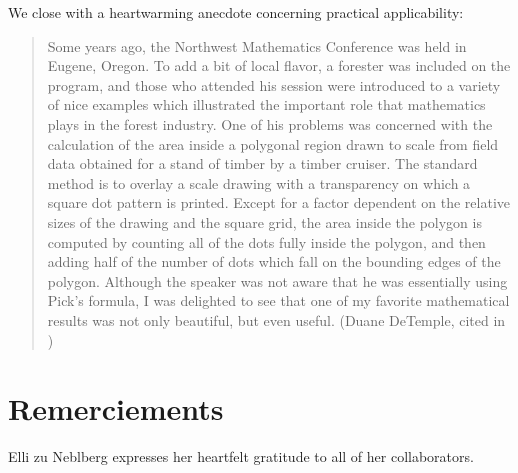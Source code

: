 \documentclass[a4paper]{amsart}
\numberwithin{equation}{section}
\theoremstyle{plain}
\theoremstyle{definition}
\begin{document}
We close with a heartwarming anecdote concerning practical applicability: 

\begin{quote}
  Some years ago, the Northwest Mathematics Conference was held in Eugene,
  Oregon. To add a bit of local flavor, a forester was included on the program,
  and those who attended his session were introduced to a variety of nice
  examples which illustrated the important role that mathematics plays in the
  forest industry. One of his problems was concerned with the calculation of
  the area inside a polygonal region drawn to scale from field data obtained for
  a stand of timber by a timber cruiser. The standard method is to overlay a
  scale drawing with a transparency on which a square dot pattern is printed.
  Except for a factor dependent on the relative sizes of the drawing and the
  square grid, the area inside the polygon is computed by counting all of the
  dots fully inside the polygon, and then adding half of the number of dots
  which fall on the bounding edges of the polygon. Although the speaker was
  not aware that he was essentially using Pick's formula, I was delighted to see
  that one of my favorite mathematical results was not only beautiful, but even
  useful. (Duane DeTemple, cited in \cite{Gruenbaum:Shepard:1993})
\end{quote}


\section*{Remerciements}

Elli zu Neblberg expresses her heartfelt gratitude to all of her collaborators.





\end{document}

